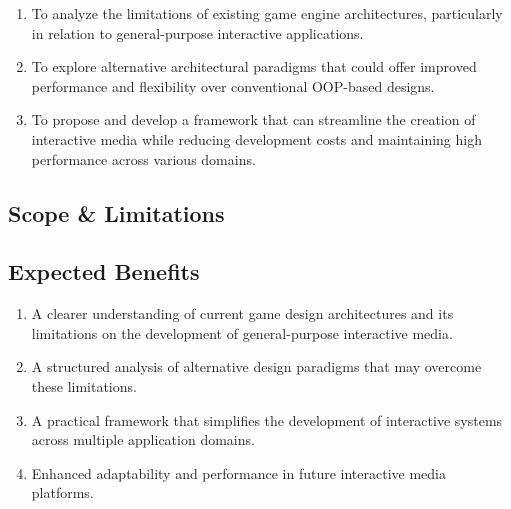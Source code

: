 \begin{enumerate}
    \item To analyze the limitations of existing game engine architectures, particularly in relation to general-purpose interactive applications.
    \item To explore alternative architectural paradigms that could offer improved performance and flexibility over conventional OOP-based designs.
    \item To propose and develop a framework that can streamline the creation of interactive media while reducing development costs and maintaining high performance across various domains.
\end{enumerate}

\subsection{Scope \& Limitations}
\label{subsec:scope-and-limitation}

\subsection{Expected Benefits}
\label{subsec:expected-benefits}

\begin{enumerate}
    \item A clearer understanding of current game design architectures and its limitations on the development of general-purpose interactive media.
    \item A structured analysis of alternative design paradigms that may overcome these limitations.
    \item A practical framework that simplifies the development of interactive systems across multiple application domains.
    \item Enhanced adaptability and performance in future interactive media platforms.
\end{enumerate}